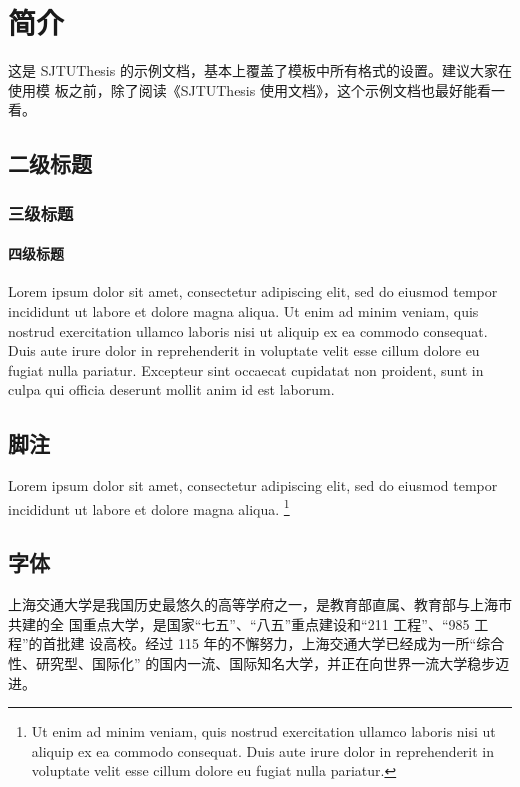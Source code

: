 
\chapter{简介}

这是 SJTUThesis 的示例文档，基本上覆盖了模板中所有格式的设置。建议大家在使用模
板之前，除了阅读《SJTUThesis 使用文档》，这个示例文档也最好能看一看。

\section{二级标题}

\subsection{三级标题}

\subsubsection{四级标题}

Lorem ipsum dolor sit amet, consectetur adipiscing elit, sed do eiusmod tempor
incididunt ut labore et dolore magna aliqua. Ut enim ad minim veniam, quis
nostrud exercitation ullamco laboris nisi ut aliquip ex ea commodo consequat.
Duis aute irure dolor in reprehenderit in voluptate velit esse cillum dolore eu
fugiat nulla pariatur. Excepteur sint occaecat cupidatat non proident, sunt in
culpa qui officia deserunt mollit anim id est laborum.

\section{脚注}

Lorem ipsum dolor sit amet, consectetur adipiscing elit, sed do eiusmod tempor
incididunt ut labore et dolore magna aliqua. \footnote{Ut enim ad minim veniam,
quis nostrud exercitation ullamco laboris nisi ut aliquip ex ea commodo
consequat. Duis aute irure dolor in reprehenderit in voluptate velit esse cillum
dolore eu fugiat nulla pariatur.}

\section{字体}


上海交通大学是我国历史最悠久的高等学府之一，是教育部直属、教育部与上海市共建的全
国重点大学，是国家“七五”、“八五”重点建设和“211 工程”、“985 工程”的首批建
设高校。经过 115 年的不懈努力，上海交通大学已经成为一所“综合性、研究型、国际化”
的国内一流、国际知名大学，并正在向世界一流大学稳步迈进。 


